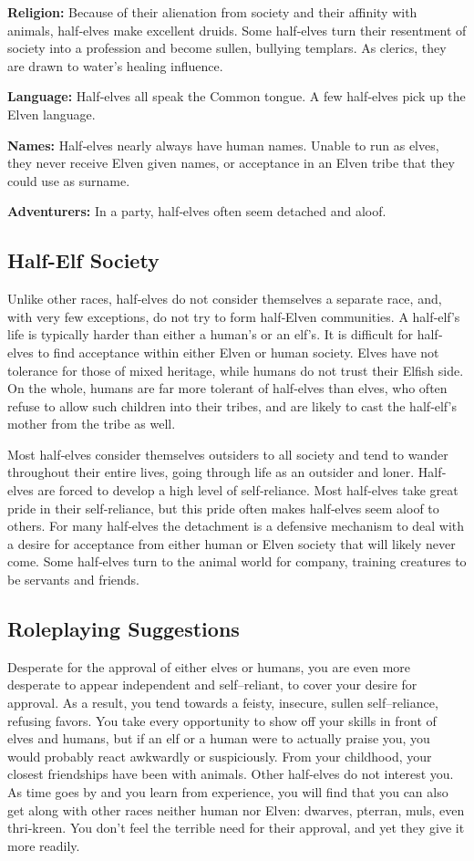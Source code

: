 \documentclass[10pt,a4paper,twocolumn]{d20}
\begin{document}
\textbf{Religion:} Because of their alienation from society and their affinity with animals, half‐elves make excellent druids. Some half‐elves turn their resentment of society into a profession and become sullen, bullying templars. As clerics, they are drawn to water’s healing influence.

\textbf{Language:} Half‐elves all speak the Common tongue. A few half‐elves pick up the Elven language.

\textbf{Names:} Half‐elves nearly always have human names. Unable to run as elves, they never receive Elven given names, or acceptance in an Elven tribe that they could use as surname.

\textbf{Adventurers:} In a party, half‐elves often seem detached and aloof.

\subsection{Half-Elf Society}
Unlike other races, half‐elves do not consider themselves a separate race, and, with very few exceptions, do not try to form half‐Elven communities. A half‐elf’s life is typically harder than either a human’s or an elf’s. It is difficult for half‐elves to find acceptance within either Elven or human society. Elves have not tolerance for those of mixed heritage, while humans do not trust their Elfish side. On the whole, humans are far more tolerant of half‐elves than elves, who often refuse to allow such children into their tribes, and are likely to cast the half‐elf’s mother from the tribe as well.

Most half‐elves consider themselves outsiders to all society and tend to wander throughout their entire lives, going through life as an outsider and loner. Half‐elves are forced to develop a high level of self‐reliance. Most half‐elves take great pride in their self‐reliance, but this pride often makes half‐elves seem aloof to others. For many half‐elves the detachment is a defensive mechanism to deal with a desire for acceptance from either human or Elven society that will likely never come. Some half‐elves turn to the animal world for company, training creatures to be servants and friends.

\subsection{Roleplaying Suggestions}
Desperate for the approval of either elves or humans, you are even more desperate to appear independent and self–reliant, to cover your desire for approval. As a result, you tend towards a feisty, insecure, sullen self–reliance, refusing favors. You take every opportunity to show off your skills in front of elves and humans, but if an elf or a human were to actually praise you, you would probably react awkwardly or suspiciously. From your childhood, your closest friendships have been with animals. Other half‐elves do not interest you. As time goes by and you learn from experience, you will find that you can also get along with other races neither human nor Elven: dwarves, pterran, muls, even thri‐kreen. You don’t feel the terrible need for their approval, and yet they give it more readily.
\end{document}
